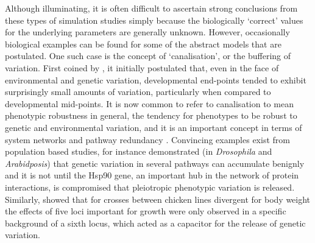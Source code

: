 Although illuminating, it is often difficult to ascertain strong conclusions from these types of simulation studies simply because the biologically `correct' values for the underlying parameters are generally unknown. However, occasionally biological examples can be found for some of the abstract models that are postulated. One such case is the concept of `canalisation', or the buffering of variation. First coined by \citet{Waddington1942}, it initially postulated that, even in the face of environmental and genetic variation, developmental end-points tended to exhibit surprisingly small amounts of variation, particularly when compared to developmental mid-points. It is now common to refer to canalisation to mean phenotypic robustness in general, the tendency for phenotypes to be robust to genetic and environmental variation, and it is an important concept in terms of system networks and pathway redundancy \citep{Avery1992, Thomas1993}. Convincing examples exist from population based studies, for instance \citet{Bergman2003} demonstrated (in \emph{Drosophila} and \emph{Arabidposis}) that genetic variation in several pathways can accumulate benignly and it is not until the Hsp90 gene, an important hub in the network of protein interactions, is compromised that pleiotropic phenotypic variation is released. Similarly, \citet{Carlborg2006} showed that for crosses between chicken lines divergent for body weight the effects of five loci important for growth were only observed in a specific background of a sixth locus, which acted as a capacitor for the release of genetic variation. 

